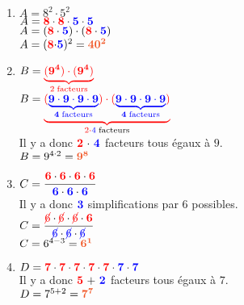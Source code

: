 \documentclass[a4paper,12pt]{report}
\begin{document}
\begin{Correction}
\begin{EXO}{}{}
\begin{enumerate}[]
\item $A=8^{2}\cdot 5^{2}$\\$A=\mathbf{\color{red}{8}} \cdot \mathbf{\color{red}{8}} \cdot \mathbf{\color{blue}{5}} \cdot \mathbf{\color{blue}{5}}$\\$A=\mathbf{(\color{red}{8}} \cdot \mathbf{\color{blue}{5}}) \cdot (\mathbf{\color{red}{8}} \cdot \mathbf{\color{blue}{5}})$\\$A= (\color{red}{\mathbf{8}} \color{black}{\cdot} \color{blue}{\mathbf{5}}\color{black}{)^{2}}={\color[HTML]{f15929}\boldsymbol{40^{2}}}$
\item $B=\color{red}{\underbrace{\mathbf{\color{red}{(9^{4})}} \cdot \mathbf{\color{red}{(9^{4})}}}_{2\thickspace\text{facteurs}}}$\\$B=\color{red}{\underbrace{\mathbf{\color{red}{(\color{blue}{\underbrace{\mathbf{\color{blue}{9}} \cdot \mathbf{\color{blue}{9}}\cdot \mathbf{\color{blue}{9}}\cdot \mathbf{\color{blue}{9}}}_{4\thickspace\text{facteurs}}}\color{red})}} \cdot \mathbf{\color{red}{(\color{blue}{\underbrace{\mathbf{\color{blue}{9}} \cdot \mathbf{\color{blue}{9}}\cdot \mathbf{\color{blue}{9}}\cdot \mathbf{\color{blue}{9}}}_{4\thickspace\text{facteurs}}}\color{red})}}}_{2\cdot\color{blue}{4}\thickspace\color{black}{\text{facteurs}}}}$\\Il y a donc $\mathbf{\color{red}{2}~\color{black}{\cdot}~\color{blue}{4}}$ facteurs tous égaux à $9$.\\$B=9^{4\cdot2} = {\color[HTML]{f15929}\boldsymbol{9^{8}}}$
\item $C=\dfrac{\mathbf{\color{red}{6}} \cdot \mathbf{\color{red}{6}}\cdot \mathbf{\color{red}{6}}\cdot \mathbf{\color{red}{6}}}{\mathbf{\color{blue}{6}} \cdot \mathbf{\color{blue}{6}}\cdot \mathbf{\color{blue}{6}}}$\\Il y a donc $\mathbf{\color{blue}{3}}$ simplifications par $6$ possibles.\\$C=\dfrac{\mathbf{\color{red}{\cancel{6}}} \cdot \mathbf{\color{red}{\cancel{6}}}\cdot \mathbf{\color{red}{\cancel{6}}}\cdot\mathbf{\color{red}{6}}}{\mathbf{\color{blue}{\cancel{6}}} \cdot \mathbf{\color{blue}{\cancel{6}}}\cdot \mathbf{\color{blue}{\cancel{6}}}}$\\$C=6^{4-3}={\color[HTML]{f15929}\boldsymbol{6^{1}}}$
\item $D=\mathbf{\color{red}{7}} \cdot \mathbf{\color{red}{7}}\cdot \mathbf{\color{red}{7}}\cdot \mathbf{\color{red}{7}}\cdot \mathbf{\color{red}{7}} \cdot \mathbf{\color{blue}{7}} \cdot \mathbf{\color{blue}{7}}$\\Il y a donc $\mathbf{\color{red}{5}~\color{black}{+}~\color{blue}{2}}$ facteurs tous égaux à $7$.\\$D=7^{5+2} = {\color[HTML]{f15929}\boldsymbol{7^{7}}}$

\end{enumerate}
\end{EXO}
\end{Correction}
\end{document}
